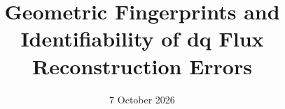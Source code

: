 \title{Geometric Fingerprints and Identifiability of dq Flux Reconstruction Errors}
\author{}
\date{7 October 2026}
\newcommand{\PaperAbstract}{Which measurement and parameter errors can be distinguished from reconstructed dq flux? Exact and first-order transformations expose resistance mismatch, coherent rotor-frame rotation, current relabeling, voltage and speed errors. A stacked sensitivity operator separates local rank from conditioning and reveals an exact resistance versus current-proportional voltage confounder. Synthetic tests verify signs, coordinate chain rules and recovery under qualified assumptions. Evaluating the confounding columns on portable measured operating-point support confirms that additional speeds do not remove an identical nuisance direction. No physical sensor error is estimated from that support test.}
\newif\ifshowglossary\showglossarytrue
\newif\ifshowbibliography\showbibliographytrue
